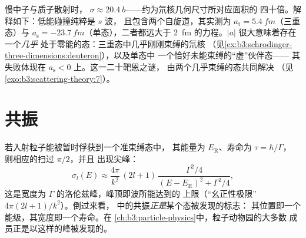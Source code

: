 \begin{example}[中子遇见质子]\label{ex:b3:scattering-theory:np}
慢中子与质子散射时， $\sigma \approx
\qty{20.4}{b}$——约为氘核几何尺寸所对应面积的
四十倍。解释如下：低能碰撞纯粹是 $s$ 波，
且包含两个自旋道，其实测为
$a_{\text{t}} = \qty{5.4}{fm}$（三重态）与 $a_{\text{s}} =
\qty{-23.7}{fm}$（单态），二者都远大于
\qty{2}{fm} 的力程。$|a|$ 很大意味着存在一个\emph{几乎}
处于零能的态：三重态中几乎刚刚束缚的氘核
（见\cref{ex:b3:schrodinger-three-dimensions:deuteron}），以及单态中
一个恰好未能束缚的“虚”伙伴态——
其失败体现在 $a_{\text{s}} < 0$ 上。这一二十靶恩之谜，
由两个几乎束缚的态共同解决
（见\cref{exo:b3:scattering-theory:7}）。
\end{example}

\section{共振}

\begin{proposition}\label{prop:b3:scattering-theory:resonance}
若入射粒子能被暂时俘获到一个准束缚态中，
其能量为 $E_{\text{R}}$、寿命为 $\tau = \hbar/\Gamma$，
则相应的扫过 $\pi/2$，并且
出现尖峰：
\[
\sigma_l(E) \approx \frac{4\pi}{k^2}\,(2l+1)\,
\frac{\Gamma^2/4}{(E - E_{\text{R}})^2 + \Gamma^2/4} ,
\]
这是宽度为 $\Gamma$ 的洛伦兹峰，峰顶即波所能达到的
上限（“幺正性极限” $4\pi(2l+1)/k^2$）。倒过来看，
中的共振\emph{正是}某个态被发现的标志：
其位置即一个能级，其宽度即一个寿命。在
\cref{ch:b3:particle-physics}中，粒子动物园的大多数
成员正是以这样的峰被发现的。
\end{proposition}
\admitted

